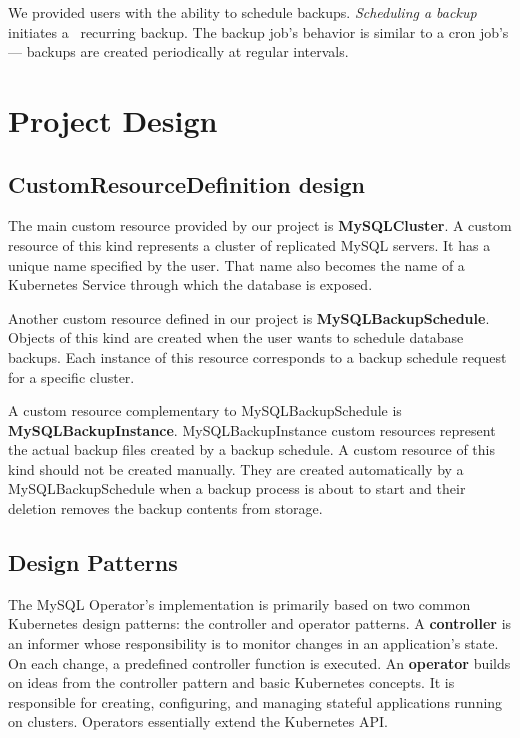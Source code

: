 We provided users with the ability to schedule backups. \textit{Scheduling a backup} initiates a~
recurring backup. The backup job's behavior is similar to a cron job's --- backups are created
periodically at regular intervals.

\section{Project Design}

\subsection{CustomResourceDefinition design}
The main custom resource provided by our project is \textbf{MySQLCluster}. A custom resource of this kind
represents a cluster of replicated MySQL servers. It has a unique name specified by the user.
That name also becomes the name of a Kubernetes Service through which the database is exposed.

Another custom resource defined in our project is \textbf{MySQLBackupSchedule}. Objects of this kind are created when
the user wants to schedule database backups. Each instance of this resource corresponds to a backup
schedule request for a specific cluster.

A custom resource complementary to MySQLBackupSchedule is \textbf{MySQLBackupInstance}.
MySQLBackupInstance custom resources represent the actual backup files created by a backup schedule.
A custom resource of this kind should not be created manually. They are created automatically
by a MySQLBackupSchedule when a backup process is about to start and their deletion
removes the backup contents from storage.

\subsection{Design Patterns}
The MySQL Operator's implementation is primarily based on two common Kubernetes design patterns:
the controller and operator patterns. A \textbf{controller} is an informer whose responsibility is
to monitor changes in an application's state. On each change, a predefined controller function is
executed. An \textbf{operator} builds on ideas from the controller pattern and basic Kubernetes
concepts. It is responsible for creating, configuring, and managing stateful applications running on
clusters. Operators essentially extend the Kubernetes API.

